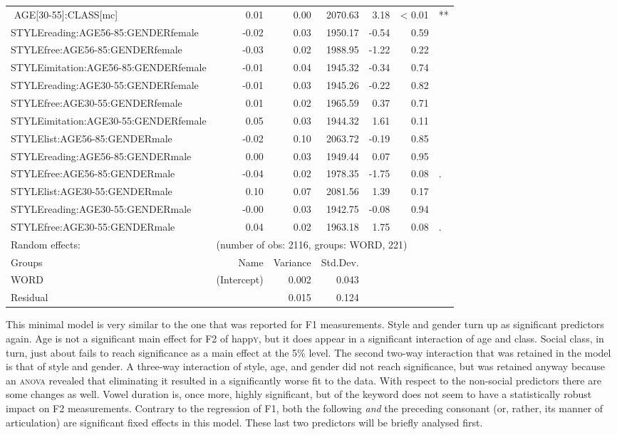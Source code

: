 {\begin{longtable}[c]{p{}rrrrrl}
$$		AGE[30-55]:CLASS[mc] & 0.01 & 0.00 & 2070.63 & 3.18 & < 0.01 & ** \\ 
		STYLEreading:AGE56-85:GENDERfemale & -0.02 & 0.03 & 1950.17 & -0.54 & 0.59 & \\ 
		STYLEfree:AGE56-85:GENDERfemale & -0.03 & 0.02 & 1988.95 & -1.22 & 0.22 & \\ 
		STYLEimitation:AGE56-85:GENDERfemale & -0.01 & 0.04 & 1945.32 & -0.34 & 0.74 & \\ 
		STYLEreading:AGE30-55:GENDERfemale & -0.01 & 0.03 & 1945.26 & -0.22 & 0.82 & \\ 
		STYLEfree:AGE30-55:GENDERfemale & 0.01 & 0.02 & 1965.59 & 0.37 & 0.71 & \\ 
		STYLEimitation:AGE30-55:GENDERfemale & 0.05 & 0.03 & 1944.32 & 1.61 & 0.11 & \\ 
		STYLElist:AGE56-85:GENDERmale & -0.02 & 0.10 & 2063.72 & -0.19 & 0.85 & \\ 
		STYLEreading:AGE56-85:GENDERmale & 0.00 & 0.03 & 1949.44 & 0.07 & 0.95 & \\ 
		STYLEfree:AGE56-85:GENDERmale & -0.04 & 0.02 & 1978.35 & -1.75 & 0.08 & .\\ 
		STYLElist:AGE30-55:GENDERmale & 0.10 & 0.07 & 2081.56 & 1.39 & 0.17 & \\ 
		STYLEreading:AGE30-55:GENDERmale & -0.00 & 0.03 & 1942.75 & -0.08 & 0.94 & \\ 
		STYLEfree:AGE30-55:GENDERmale & 0.04 & 0.02 & 1963.18 & 1.75 & 0.08 & .\\ 
		\hline
		Random effects: & \multicolumn{6}{l}{(number of obs: 2116, groups: WORD, 221)} \\
		Groups &         Name & Variance &      Std.Dev. & & & \\
		WORD &  (Intercept) & 0.002 & 0.043 & & & \\
		Residual  &         & 0.015 & 0.124 & & & \\
		\hline
	\end{longtable}
}

This minimal model is very similar to the one that was reported for F1 measurements.
Style and gender turn up as significant predictors again.
Age is not a significant main effect for F2 of happ\textsc{y}, but it does appear in a significant interaction of age and class.
Social class, in turn, just about fails to reach significance as a main effect at the 5\% level.
The second two-way interaction that was retained in the model is that of style and gender.
A three-way interaction of style, age, and gender did not reach significance, but was retained anyway because an \textsc{anova} revealed that eliminating it resulted in a significantly worse fit to the data.
With respect to the non-social predictors there are some changes as well.
Vowel duration is, once more, highly significant, but  of the keyword does not seem to have a statistically robust impact on F2 measurements.
Contrary to the regression of F1, both the following \emph{and} the preceding consonant (or, rather, its manner of articulation) are significant fixed effects in this model.
These last two predictors will be briefly analysed first.

